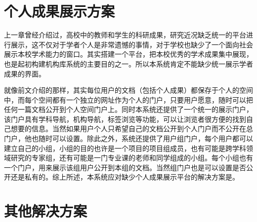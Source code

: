 \section{个人成果展示方案}
\label{sec:display}

上一章曾经介绍过，高校中的教师和学生的科研成果，研究近况缺乏统一的平台进行展示，这不仅对于学者个人是非常遗憾的事情，对于学校也缺少了一个面向社会展示本校学术能力的窗口。其实搭建一个平台，把本校优秀的学术成果集中展现，也是起初构建机构库系统的主要目的之一。所以本系统肯定不能缺少统一展示学者成果的界面。

就像前文介绍的那样，其实每位用户的文档（包括个人成果）都保存于个人的空间中，而每个空间都有一个独立的网址作为个人的门户，只要用户愿意，随时可以把任何一篇文档公开到个人空间门户上。同时本系统还提供了一个统一的展示门户，该门户具有学科导航，机构导航，标签浏览等功能，可以让浏览者很方便的找到自己想要的信息。当然如果用户个人只希望自己的文档公开到个人门户而不公开在总门户，他也随时可以设置。除此之外，系统还提供了用户组门户，每个用户都可以建立自己的小组，小组的目的也许是一个项目的项目组成员，也有可能是跨学科领域研究的专家组，还有可能是一门专业课的老师和同学组成的小组。每个小组也有一个门户，用来展示该组用户公开到本组的文档。当然组门户也是可以设置是否公开还是私有的。综上所述，本系统应对缺少个人成果展示平台的解决方案是。

\section{其他解决方案}
\label{sec:project}


